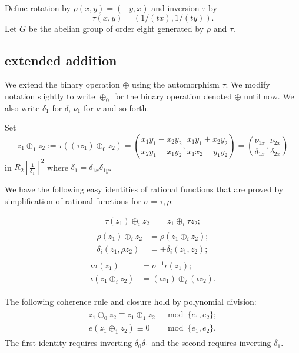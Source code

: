 \documentclass[12pt]{article}
\newcommand{\f}[1]{\frac{1}{#1}}
\begin{document}
Define rotation by $\rho(x,y)=(-y,x)$ and
inversion $\tau$ by 
\[
\tau(x,y) = (1/(tx),1/(ty)).
\]
Let $G$ be the abelian group of order eight generated by 
 $\rho$ and $\tau$.


\subsection{extended addition}

We extend the binary operation $\oplus$ using the automorphism $\tau$.
We modify notation slightly to write $\oplus_0$ for the binary
operation denoted $\oplus$ until now.  We also write $\delta_1$ for $\delta$,
$\nu_1$ for $\nu$ and so forth.

Set
\begin{equation}\label{eqn:tauplus}
z_1\oplus_1 z_2 := \tau((\tau z_1)\oplus_0 z_2)= \left(\frac{x_1y_1 - x_2 y_2}{x_2
    y_1-x_1 y_2},\frac{x_1 y_1 + x_2 y_2}{x_1 x_2 + y_1 y_2}\right) 
= (\frac{\nu_{1x}}{\delta_{1x}},\frac{\nu_{2x}}{\delta_{2x}})
\end{equation}
in $R_2[\f{\delta_1}]^2$ where $\delta_1 = \delta_{1x}\delta_{1y}$.

We have the following easy identities of rational functions that are proved
by simplification of rational functions for $\sigma=\tau,\rho$:

\begin{align}\label{eqn:r-tau}
\tau (z_1)\oplus_i z_2 &= z_1 \oplus_i \tau z_2;
\end{align}
\begin{align}\label{eqn:r-rho}
\begin{split}
\rho(z_1)\oplus_i z_2 &= \rho(z_1\oplus_i z_2);\\
\delta_i(z_1,\rho z_2) &= \pm \delta_i(z_1,z_2);
\end{split}
\end{align}
\begin{align}\label{eqn:r-iota}
\begin{split}
\iota \sigma(z_1) &= \sigma^{-1} \iota (z_1);\\
\iota (z_1\oplus_i z_2) &= (\iota z_1)\oplus_i (\iota z_2).
\end{split}
\end{align}

The following coherence rule and closure hold by polynomial division:
\begin{align}\label{eqn:r-coh}
\begin{split}
z_1 \oplus_0 z_2 \equiv z_1 \oplus_1 z_2 &\mod \{e_1,e_2\};\\
e(z_1\oplus_1 z_2) \equiv 0 &\mod \{e_1,e_2\}.
\end{split}
\end{align}
The first identity requires inverting $\delta_0\delta_1$ and the
second requires inverting $\delta_1$.
\end{document}
